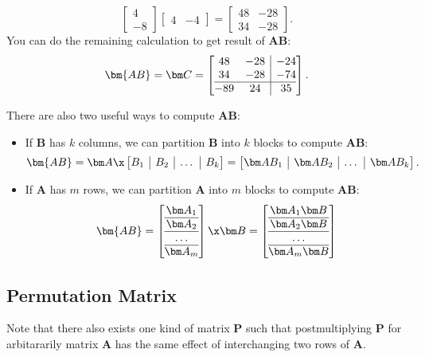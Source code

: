 \begin{enumerate}
\begin{example}
\[\begin{bmatrix}
4\\-8
\end{bmatrix}\begin{bmatrix}
4&-4
\end{bmatrix}=\begin{bmatrix}
48&-28\\34&-28
\end{bmatrix}.
\]
You can do the remaining calculation to get result of $\bm{AB}$:
\[
\bm{AB}=\bm C=\left[\begin{array}{@{}cc|c@{}}
48&-28&-24\\34&-28&-74\\\hline-89&24&35
\end{array}\right].
\]
\end{example}
There are also two useful ways to compute $\bm{AB}$:
\begin{itemize}
\item
If $\bm B$ has $k$ columns, we can partition $\bm B$ into $k$ blocks to compute $\bm{AB}$:
\[
\bm{AB}=\bm A\x
\left[
\begin{array}{@{}c|c|c|c@{}}
B_1&B_2&\dots&B_k
\end{array}\right]
=\left[
\begin{array}{@{}c|c|c|c@{}}
\bm AB_1&\bm AB_2&\dots&\bm AB_k
\end{array}\right].
\]
\item
If $\bm A$ has $m$ rows, we can partition $\bm A$ into $m$ blocks to compute $\bm{AB}$:
\[
\bm{AB}=\left[\begin{array}{@{}c@{}}
\bm A_1\\
\hline
\bm A_2\\
\hline
\dots\\
\hline
\bm A_{m}
\end{array}\right]\x\bm B
=\left[\begin{array}{@{}c@{}}
\bm A_1\bm B\\
\hline
\bm A_2\bm B\\
\hline
\dots\\
\hline
\bm A_{m}\bm B
\end{array}\right]
\]
\end{itemize}
\end{enumerate}
\subsection{Permutation Matrix}
Note that there also exists one kind of matrix $\bm P$ such that postmultiplying $\bm P$ for arbitararily matrix $\bm A$ has the same effect of interchanging two rows of $\bm A$.

